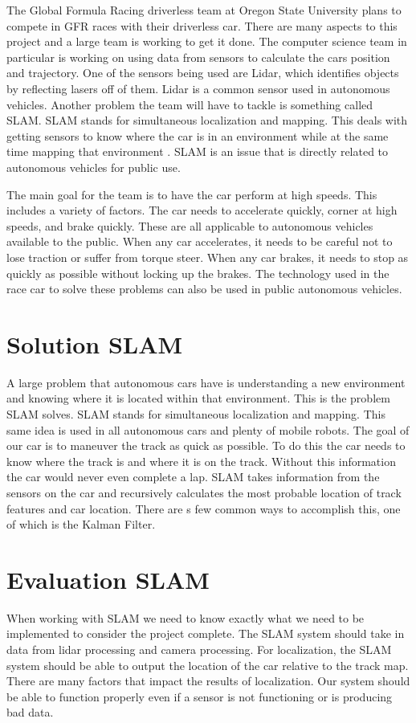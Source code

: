 \documentclass[10pt]{article}
\begin{document}
The Global Formula Racing driverless team at Oregon State University plans to compete in GFR races with their driverless car. There are many aspects to this project and a large team is working to get it done. The computer science team in particular is working on using data from sensors to calculate the cars position and trajectory. One of the sensors being used are Lidar, which identifies objects by reflecting lasers off of them. Lidar is a common sensor used in autonomous vehicles. Another problem the team will have to tackle is something called SLAM. SLAM stands for simultaneous localization and mapping. This deals with getting sensors to know where the car is in an environment while at the same time mapping that environment  \citep{Kudan}. SLAM is an  issue that is directly related to autonomous vehicles for public use.


The main goal for the team is to have the car perform at high speeds. This includes a variety of factors. The car needs to accelerate quickly, corner at high speeds, and brake quickly. These are all applicable to autonomous vehicles available to the public. When any car accelerates, it needs to be careful not to lose traction or suffer from torque steer. When any car brakes, it needs to stop as quickly as possible without locking up the brakes. The technology used in the race car to solve these problems can also be used in public autonomous vehicles.

\section{Solution SLAM}
A large problem that autonomous cars have is understanding a new environment and knowing where it is located within that environment. This is the problem SLAM solves. SLAM stands for simultaneous localization and mapping. This same idea is used in all autonomous cars and plenty of mobile robots. The goal of our car is to maneuver the track as quick as possible. To do this the car needs to know where the track is and where it is on the track. Without this information the car would never even complete a lap. SLAM takes information from the sensors on the car and recursively calculates the most probable location of track features and car location. There are s few common ways to accomplish this, one of which is the Kalman Filter.

\section{Evaluation SLAM}
When working with SLAM we need to know exactly what we need to be implemented to consider the project complete. The SLAM system should take in data from lidar processing and camera processing. For localization, the SLAM system should be able to output the location of the car relative to the track map. There are many factors that impact the results of localization. Our system should be able to function properly even if a sensor is not functioning or is producing bad data.
\end{document}

